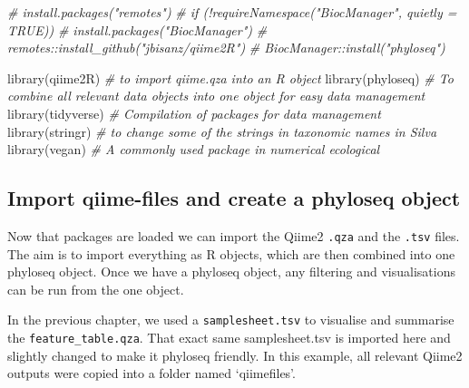 \documentclass[
]{book}
\newenvironment{Shaded}{\begin{snugshade}}{\end{snugshade}}
\newcommand{\CommentTok}[1]{\textcolor[rgb]{0.56,0.35,0.01}{\textit{#1}}}
\newcommand{\FunctionTok}[1]{\textcolor[rgb]{0.00,0.00,0.00}{#1}}
\newcommand{\NormalTok}[1]{#1}
\begin{document}
\begin{Shaded}
\begin{Highlighting}[]
\CommentTok{\# install.packages("remotes")}
\CommentTok{\# if (!requireNamespace("BiocManager", quietly = TRUE))}
\CommentTok{\#  install.packages("BiocManager")}
\CommentTok{\# remotes::install\_github("jbisanz/qiime2R")}
\CommentTok{\# BiocManager::install("phyloseq")}

\FunctionTok{library}\NormalTok{(qiime2R)  }\CommentTok{\# to import qiime.qza into an R object}
\FunctionTok{library}\NormalTok{(phyloseq) }\CommentTok{\# To combine all relevant data objects into one object for easy data management}
\FunctionTok{library}\NormalTok{(tidyverse) }\CommentTok{\# Compilation of packages for data management }
\FunctionTok{library}\NormalTok{(stringr)  }\CommentTok{\# to change some of the strings in taxonomic names in Silva }
\FunctionTok{library}\NormalTok{(vegan)   }\CommentTok{\# A commonly used package in numerical ecological }
\end{Highlighting}
\end{Shaded}

\hfill\break

\hypertarget{import-qiime-files-and-create-a-phyloseq-object}{%
\subsection{Import qiime-files and create a phyloseq object}\label{import-qiime-files-and-create-a-phyloseq-object}}

Now that packages are loaded we can import the Qiime2 \texttt{.qza} and the \texttt{.tsv} files. The aim is to import everything as R objects, which are then combined into one phyloseq object. Once we have a phyloseq object, any filtering and visualisations can be run from the one object.

In the previous chapter, we used a \texttt{samplesheet.tsv} to visualise and summarise the \texttt{feature\_table.qza}. That exact same samplesheet.tsv is imported here and slightly changed to make it phyloseq friendly. In this example, all relevant Qiime2 outputs were copied into a folder named `qiimefiles'.
\end{document}
